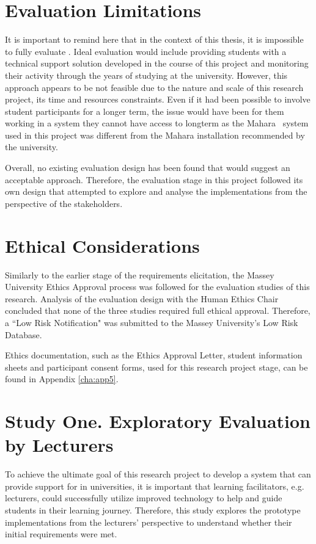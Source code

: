 \section{Evaluation Limitations}
\label{sec:evallimit}
It is important to remind here that in the context of this thesis, it is
impossible to fully evaluate \LLLsn. Ideal evaluation would include providing
students with a technical support solution developed in the course of this
project and monitoring their activity through the years of studying at the
university. However, this approach appears to be not feasible due to the nature
and scale of this research project, its time and resources constraints. Even if
it had been possible to involve student participants for a longer term, the
issue would have been for them working in a system they cannot have access to
longterm as the Mahara \ep~system used in this project was different from the
Mahara installation recommended by the university.

Overall, no existing evaluation design has been found that would suggest an
acceptable approach. Therefore, the evaluation stage in this project followed
its own design that attempted to explore and analyse the implementations from
the perspective of the \LLLs stakeholders.

\section{Ethical Considerations}

Similarly to the earlier stage of the requirements elicitation, the Massey
University Ethics Approval process was followed for the evaluation studies of
this research. Analysis of the evaluation design with the Human Ethics Chair
concluded that none of the three studies required full ethical approval.
Therefore, a ``Low Risk Notification" was submitted to the Massey University's
Low Risk Database.

Ethics documentation, such as the Ethics Approval Letter, student information
sheets and participant consent forms, used for this research project stage, can
be found in Appendix \ref{cha:app5}.

\section{Study One. Exploratory Evaluation by Lecturers}
\label{sec:one}

To achieve the ultimate goal of this research project to develop a system that
can provide support for \LLLs in universities, it is important that learning
facilitators, e.g. lecturers, could successfully utilize improved technology to
help and guide students in their learning journey. Therefore, this study
explores the prototype implementations from the lecturers' perspective to
understand whether their initial requirements were met.


